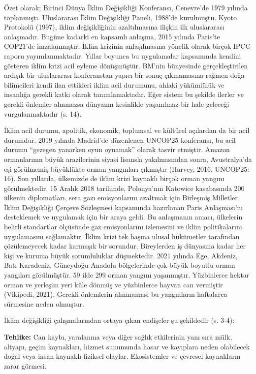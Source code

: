\documentclass[
]{book}
\begin{document}
Özet olarak; Birinci Dünya İklim Değişikliği Konferansı, Cenevre'de 1979 yılında toplanmıştı. Uluslararası İklim Değişikliği Paneli, 1988'de kurulmuştu. Kyoto Protokolü (1997), iklim değişikliğinin azaltılmasına ilişkin ilk uluslararası anlaşmadır. Bugüne kadarki en kapsamlı anlaşma, 2015 yılında Paris'te COP21'de imzalanmıştır. İklim krizinin anlaşılmasına yönelik olarak birçok IPCC raporu yayımlanmaktadır. Yıllar boyunca bu uygulamalar kapsamında kendini gösteren iklim krizi acil eyleme dönüşmüştür. BM'nin bünyesinde gerçekleştirilen ardışık bir uluslararası konferanstan yapıcı bir sonuç çıkmamasına rağmen doğa bilimcileri kendi ilan ettikleri iklim acil durumunu, ahlaki yükümlülük ve insanlığa gerekli katkı olarak tanımlamaktadır. Eğer sistem bu şekilde ilerler ve gerekli önlemler alınmazsa dünyanın kesinlikle yaşanılmaz bir hale geleceği vurgulanmaktadır (s. 14).\citep{harvey2016climate}

İklim acil durumu, apolitik, ekonomik, toplumsal ve kültürel açılardan da bir acil durumdur. 2019 yılında Madrid'de düzenlenen UNCOP25 konferansı, bu acil durumu ``gezegen yanarken oyun oynamak'' olarak tasvir etmiştir. Amazon ormanlarının büyük arazilerinin siyasi lisansla yakılmasından sonra, Avustralya'da eşi görülmemiş büyüklükte orman yangınları çıkmıştır (Harvey, 2016, UNCOP25: 16). \citep{harvey2016climate} Son yıllarda, ülkemizde de iklim krizi kaynaklı birçok orman yangını görülmektedir. 15 Aralık 2018 tarihinde, Polonya'nın Katowice kasabasında 200 ülkenin diplomatları, sera gazı emisyonlarını azaltmak için Birleşmiş Milletler İklim Değişikliği Çerçeve Sözleşmesi kapsamında hazırlanan Paris Anlaşması'nı desteklemek ve uygulamak için bir araya geldi. Bu anlaşmanın amacı, ülkelerin belirli standartlar ölçüsünde gaz emisyonlarını izlemesini ve iklim politikalarını uygulamasını sağlamaktır. İklim krizi tek başına ulusal hükümetler tarafından çözülemeyecek kadar karmaşık bir sorundur. Bireylerden iş dünyasına kadar her kişi ve kuruma büyük sorumluluklar düşmektedir. \citep{dhanda2019climate} 2021 yılında Ege, Akdeniz, Batı Karadeniz, Güneydoğu Anadolu bölgelerinde çok büyük boyutlu orman yangıları görülmüştür. 59 ilde 299 orman yangını yaşanmıştır. Yüzbinlerce hektar orman ve yerleşim yeri küle dönmüş ve yüzbinlerce hayvan can vermiştir (Vikipedi, 2021). Gerekli önlemlerin alınmaması bu yangınların haftalarca sürmesine neden olmuştur.

İklim değişikliği çalışmalarından ortaya çıkan endişeler şu şekildedir (s. 3-4): \citep{pink2018climate}

\textbf{Tehlike:} Can kaybı, yaralanma veya diğer sağlık etkilerinin yanı sıra mülk, altyapı, geçim kaynakları, hizmet sunumunda hasar ve kayıplara neden olabilecek doğal veya insan kaynaklı fiziksel olaylar. Ekosistemler ve çevresel kaynakların zarar görmesi.
\end{document}

